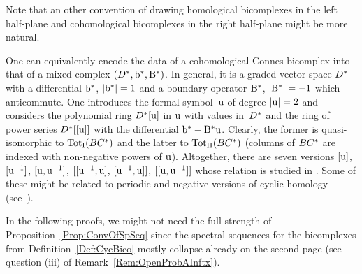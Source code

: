\documentclass[\MainFolder/Text.tex]{subfiles}
\begin{document}
Note that an other convention of drawing homological bicomplexes in the left half-plane and cohomological bicomplexes in the right half-plane might be more natural.
\begin{Remark}\label{Rem:MixedCompl}
One can equivalently encode the data of a cohomological Connes bicomplex into that of a mixed complex $(D^*,\mathrm{b}^*,\mathrm{B}^*)$. In general, it is a graded vector space $D^*$ with a differential $\mathrm{b}^*$, $|\mathrm{b}^*|=1$ and a boundary operator $\mathrm{B}^*$, $|\mathrm{B}^*|=-1$ which anticommute. One introduces the formal symbol~$\mathrm{u}$ of degree $|\mathrm{u}|= 2$ and considers the polynomial ring $D^*[\mathrm{u}]$ in $\mathrm{u}$ with values in~$D^*$ and the ring of power series $D^*[[\mathrm{u}]]$ with the differential $\mathrm{b}^* + \mathrm{B}^*\mathrm{u}$. Clearly, the former is quasi-isomorphic to ${\mathrm{Tot}_{\mathrm{I}}}(BC^{*})$ and the latter to ${\mathrm{Tot}_{\mathrm{II}}}(BC^{*})$ (columns of $BC^{*}$ are indexed with non-negative powers of $\mathrm{u}$).
Altogether, there are seven versions $[\mathrm{u}]$, $[\mathrm{u}^{-1}]$, $[\mathrm{u},\mathrm{u}^{-1}]$, $[[\mathrm{u}^{-1},\mathrm{u}]$, $[\mathrm{u}^{-1},\mathrm{u}]]$, $[[\mathrm{u},\mathrm{u}^{-1}]]$ whose relation is studied in \cite{Cieliebak2018b}. Some of these might be related to periodic and negative versions of cyclic homology (see~\cite{LodayCyclic}).
\end{Remark}
In the following proofs, we might not need the full strength of Proposition~\ref{Prop:ConvOfSpSeq} since the spectral sequences for the bicomplexes from Definition~\ref{Def:CycBico} mostly collapse already on the second page (see question (iii) of Remark~\ref{Rem:OpenProbAInftx}).
\end{document}

